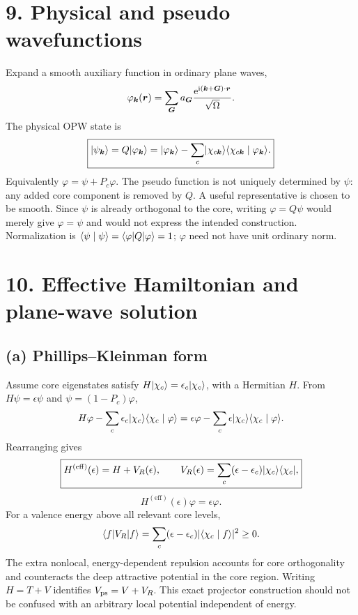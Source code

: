 \section*{9. Physical and pseudo wavefunctions}
Expand a smooth auxiliary function in ordinary plane waves,
\[
\varphi_{\boldsymbol{k}}(\boldsymbol{r})=\sum_{\boldsymbol{G}}a_{\boldsymbol{G}}
\frac{\mathrm{e}^{\mathrm{i}(\boldsymbol{k}+\boldsymbol{G})\cdot\boldsymbol{r}}}{\sqrt\Omega}.
\]
The physical OPW state is
\[
\boxed{\lvert\psi_{\boldsymbol{k}}\rangle=Q\lvert\varphi_{\boldsymbol{k}}\rangle
=\lvert\varphi_{\boldsymbol{k}}\rangle-\sum_c\lvert\chi_{c\boldsymbol{k}}\rangle
\langle\chi_{c\boldsymbol{k}}\mid\varphi_{\boldsymbol{k}}\rangle.}
\]
Equivalently $\varphi=\psi+P_c\varphi$. The pseudo function is not uniquely determined by $\psi$: any added core component is removed by $Q$. A useful representative is chosen to be smooth. Since $\psi$ is already orthogonal to the core, writing $\varphi=Q\psi$ would merely give $\varphi=\psi$ and would not express the intended construction. Normalization is $\langle\psi\mid\psi\rangle=\langle\varphi\rvert Q\lvert\varphi\rangle=1$; $\varphi$ need not have unit ordinary norm.

\section*{10. Effective Hamiltonian and plane-wave solution}
\subsection*{(a) Phillips--Kleinman form}
Assume core eigenstates satisfy $H\lvert\chi_c\rangle=\epsilon_c\lvert\chi_c\rangle$, with a Hermitian $H$. From $H\psi=\epsilon\psi$ and $\psi=(1-P_c)\varphi$,
\[
H\varphi-\sum_c\epsilon_c\lvert\chi_c\rangle\langle\chi_c\mid\varphi\rangle
=\epsilon\varphi-\sum_c\epsilon\lvert\chi_c\rangle\langle\chi_c\mid\varphi\rangle.
\]
Rearranging gives
\[
\boxed{H^{(\mathrm{eff})}(\epsilon)=H+V_R(\epsilon),\qquad
V_R(\epsilon)=\sum_c(\epsilon-\epsilon_c)\lvert\chi_c\rangle\langle\chi_c\rvert,}
\]
\[
H^{(\mathrm{eff})}(\epsilon)\varphi=\epsilon\varphi.
\]
For a valence energy above all relevant core levels,
\[
\langle f\rvert V_R\lvert f\rangle=\sum_c(\epsilon-\epsilon_c)|\langle\chi_c\mid f\rangle|^2\geq0.
\]
The extra nonlocal, energy-dependent repulsion accounts for core orthogonality and counteracts the deep attractive potential in the core region. Writing $H=T+V$ identifies $V_{\rm ps}=V+V_R$. This exact projector construction should not be confused with an arbitrary local potential independent of energy.

